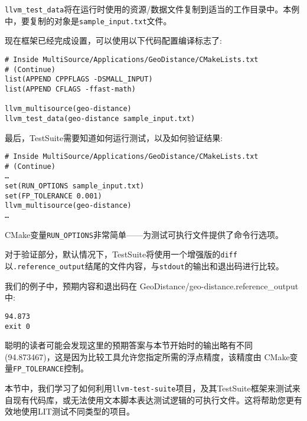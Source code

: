 \texttt{llvm\_test\_data}将在运行时使用的资源/数据文件复制到适当的工作目录中。本例中，要复制的对象是\texttt{sample\_input.txt}文件。

现在框架已经完成设置，可以使用以下代码配置编译标志了:

\begin{lstlisting}[style=styleCMake]
# Inside MultiSource/Applications/GeoDistance/CMakeLists.txt
# (Continue)
list(APPEND CPPFLAGS -DSMALL_INPUT)
list(APPEND CFLAGS -ffast-math)

llvm_multisource(geo-distance)
llvm_test_data(geo-distance sample_input.txt)
\end{lstlisting}

最后，TestSuite需要知道如何运行测试，以及如何验证结果:

\begin{lstlisting}[style=styleCMake]
# Inside MultiSource/Applications/GeoDistance/CMakeLists.txt
# (Continue)
…
set(RUN_OPTIONS sample_input.txt)
set(FP_TOLERANCE 0.001)
llvm_multisource(geo-distance)
…
\end{lstlisting}

CMake变量\texttt{RUN\_OPTIONS}非常简单——为测试可执行文件提供了命令行选项。

对于验证部分，默认情况下，TestSuite将使用一个增强版的\texttt{diff}以\texttt{.reference\_output}结尾的文件内容，与\texttt{stdout}的输出和退出码进行比较。

我们的例子中，预期内容和退出码在 GeoDistance/geo-distance.reference\_output中:

\begin{lstlisting}[style=styleCMake]
94.873
exit 0
\end{lstlisting}

聪明的读者可能会发现这里的预期答案与本节开始时的输出略有不同(94.873467)，这是因为比较工具允许您指定所需的浮点精度，该精度由 CMake变量\texttt{FP\_TOLERANCE}控制。

本节中，我们学习了如何利用\texttt{llvm-test-suite}项目，及其TestSuite框架来测试来自现有代码库，或无法使用文本脚本表达测试逻辑的可执行文件。这将帮助您更有效地使用LIT测试不同类型的项目。




























